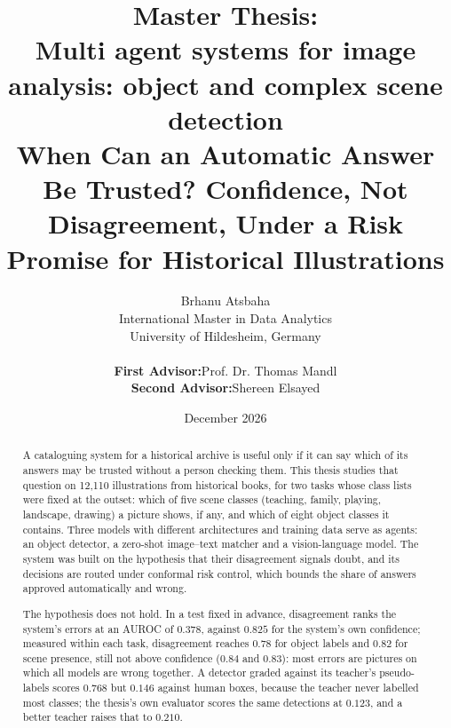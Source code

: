 \documentclass[12pt,a4paper]{report}
\title{\Large \textbf{Master Thesis:} \\[0.5cm]
\Huge \textbf{Multi agent systems for image analysis: object and complex scene detection} \\ [0.5cm]
\Large \textbf{When Can an Automatic Answer Be Trusted? Confidence, Not Disagreement, Under a Risk Promise for Historical Illustrations}}
\author{\large Brhanu Atsbaha \\
International Master in Data Analytics \\
University of Hildesheim, Germany \\[0.4cm]
\begin{tabular}{ll}
\textbf{First Advisor:} & Prof. Dr. Thomas Mandl \\
\textbf{Second Advisor:} & Shereen Elsayed
\end{tabular}
}
\date{December 2026}
\begin{document}
\maketitle
{}

\begin{abstract}
\thispagestyle{fancy}
A cataloguing system for a historical archive is useful only if it can say which of its answers may be trusted without a person checking them. This thesis studies that question on 12,110 illustrations from historical books, for two tasks whose class lists were fixed at the outset: which of five scene classes (teaching, family, playing, landscape, drawing) a picture shows, if any, and which of eight object classes it contains. Three models with different architectures and training data serve as agents: an object detector, a zero-shot image--text matcher and a vision-language model. The system was built on the hypothesis that their disagreement signals doubt, and its decisions are routed under conformal risk control, which bounds the share of answers approved automatically and wrong.

The hypothesis does not hold. In a test fixed in advance, disagreement ranks the system's errors at an AUROC of $0.378$, against $0.825$ for the system's own confidence; measured within each task, disagreement reaches $0.78$ for object labels and $0.82$ for scene presence, still not above confidence ($0.84$ and $0.83$): most errors are pictures on which all models are wrong together. A detector graded against its teacher's pseudo-labels scores $0.768$ but $0.146$ against human boxes, because the teacher never labelled most classes; the thesis's own evaluator scores the same detections at $0.123$, and a better teacher raises that to $0.210$.


\end{abstract}
\end{document}
